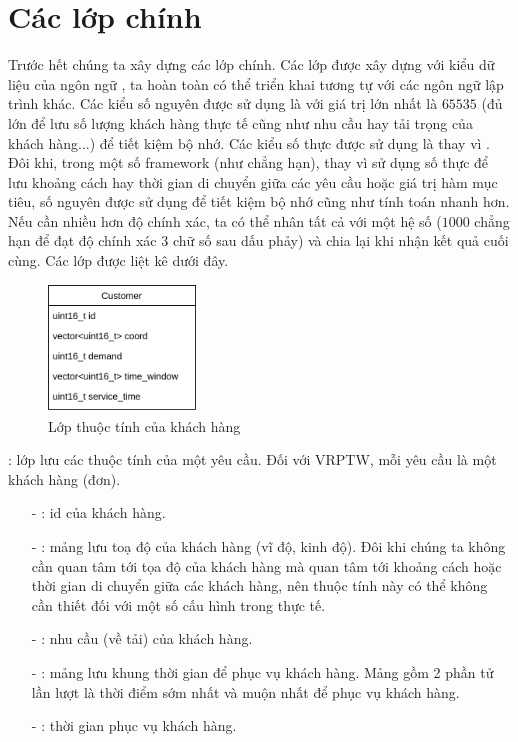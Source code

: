 \section{Các lớp chính}
\label{sec:core-objects}
Trước hết chúng ta xây dựng các lớp chính. Các lớp được xây dựng với kiểu dữ liệu của ngôn ngữ , ta hoàn toàn có thể triển khai tương tự với các ngôn ngữ lập trình khác. Các kiểu số nguyên được sử dụng là  với giá trị lớn nhất là $65535$ (đủ lớn để lưu số lượng khách hàng thực tế cũng như nhu cầu hay tải trọng của khách hàng...) để tiết kiệm bộ nhớ. Các kiểu số thực được sử dụng là  thay vì . Đôi khi, trong một số framework (như  chẳng hạn), thay vì sử dụng số thực để lưu khoảng cách hay thời gian di chuyển giữa các yêu cầu hoặc giá trị hàm mục tiêu, số nguyên được sử dụng để tiết kiệm bộ nhớ cũng như tính toán nhanh hơn. Nếu cần nhiều hơn độ chính xác, ta có thể nhân tất cả với một hệ số ($1000$ chẳng hạn để đạt độ chính xác $3$ chữ số sau dấu phảy) và chia lại khi nhận kết quả cuối cùng. Các lớp được liệt kê dưới đây.

\begin{figure}[H] %
	\centering %
	\includegraphics[width=0.35\textwidth]{figures/Customer.png}
	\caption{Lớp thuộc tính của khách hàng}
	\label{fig:fg_02}
\end{figure}

: lớp lưu các thuộc tính của một yêu cầu. Đối với VRPTW, mỗi yêu cầu là một khách hàng (đơn).

\begin{itemize}
	\item[-] : id của khách hàng.
	\item[-] : mảng lưu toạ độ của khách hàng (vĩ độ, kinh độ). Đôi khi chúng ta không cần quan tâm tới tọa độ của khách hàng mà quan tâm tới khoảng cách hoặc thời gian di chuyển giữa các khách hàng, nên thuộc tính này có thể không cần thiết đối với một số cấu hình trong thực tế.
	\item[-] : nhu cầu (về tải) của khách hàng.
	\item[-] : mảng lưu khung thời gian để phục vụ khách hàng. Mảng gồm 2 phần tử lần lượt là thời điểm sớm nhất và muộn nhất để phục vụ khách hàng.
	\item[-] : thời gian phục vụ khách hàng.
\end{itemize}

